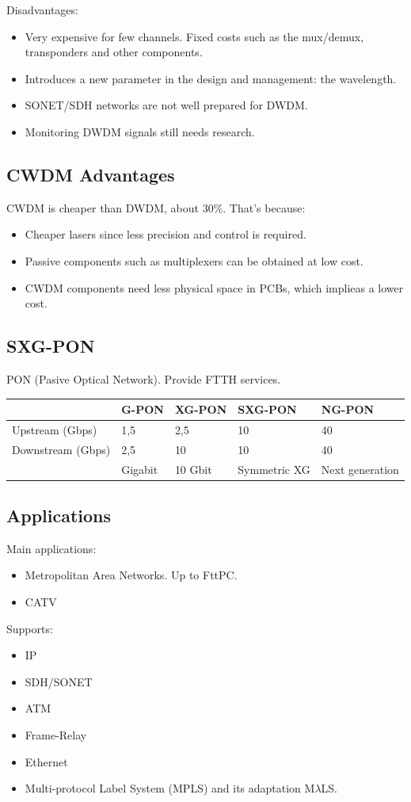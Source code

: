 \documentclass[../main.tex]{subfiles}
\begin{document}
Disadvantages:

\begin{itemize}
	\item Very expensive for few channels. Fixed costs such as the mux/demux, transponders and other components.
	\item Introduces a new parameter in the design and management: the wavelength.
	\item SONET/SDH networks are not well prepared for DWDM.
	\item Monitoring DWDM signals still needs research.
\end{itemize}

\subsection{CWDM Advantages}

CWDM is cheaper than DWDM, about 30\%. That’s because:

\begin{itemize}
	\item Cheaper lasers since less precision and control is required.
	\item Passive components such as multiplexers can be obtained at low cost.
	\item CWDM components need less physical space in PCBs, which implieas a lower cost.
\end{itemize}

\subsection{SXG-PON}

PON (Pasive Optical Network). Provide FTTH services.

\begin{tabular}{|l|l|l|l|l|}
	\hline
						& G-PON	& XG-PON	& SXG-PON	& NG-PON \\
	\hline
	Upstream (Gbps)		& 1,5	& 2,5		& 10		& 40 \\
	\hline
	Downstream (Gbps)	& 2,5	& 10		& 10		& 40 \\
	\hline
						& Gigabit			& 10 Gbit	& Symmetric XG	& Next generation \\
	\hline
\end{tabular}

\subsection{Applications}

Main applications:

\begin{itemize}
	\item Metropolitan Area Networks. Up to FttPC.
	\item CATV
\end{itemize}

Supports:

\begin{itemize}
	\item IP
	\item SDH/SONET
	\item ATM
	\item Frame-Relay
	\item Ethernet
	\item Multi-protocol Label System (MPLS) and its adaptation M$\lambda$LS.
\end{itemize}
\end{document}
